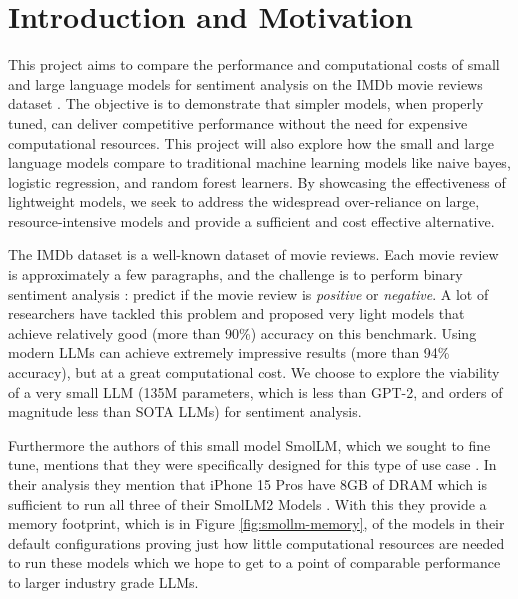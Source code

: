 \documentclass[10pt,twocolumn,letterpaper]{article}
\begin{document}
\section{Introduction and Motivation}


This project aims to compare the performance and computational costs of small and large language models for sentiment analysis on the IMDb movie reviews dataset \cite{IMDB-dataset}. The objective is to demonstrate that simpler models, when properly tuned, can deliver competitive performance without the need for expensive computational resources.  This project will also explore how the small and large language models compare to traditional machine learning models like naive bayes, logistic regression, and random forest learners. By showcasing the effectiveness of lightweight models, we seek to address the widespread over-reliance on large, resource-intensive models and provide a sufficient and cost effective alternative. 

The IMDb dataset is a well-known dataset of movie reviews. Each movie review is approximately a few paragraphs, and the challenge is to perform binary sentiment analysis : predict if the movie review is \textit{positive} or \textit{negative}. A lot of researchers have tackled this problem and proposed very light models that achieve relatively good (more than 90\%) accuracy on this benchmark. Using modern LLMs can achieve extremely impressive results (more than 94\% accuracy), but at a great computational cost. We choose to explore the viability of a very small LLM (135M parameters, which is less than GPT-2, and orders of magnitude less than SOTA LLMs) for sentiment analysis.

Furthermore the authors of this small model SmolLM, which we sought to fine tune, mentions that they were specifically designed for this type of use case \cite{hf-smollm-usecase}. In their analysis they mention that iPhone 15 Pros have 8GB of DRAM which is sufficient to run all three of their SmolLM2 Models \cite{hf-smollm2-collection}. With this they provide a memory footprint, which is in Figure \ref{fig:smollm-memory}, of the models in their default configurations proving just how little computational resources are needed to run these models which we hope to get to a point of comparable performance to larger industry grade LLMs.
\end{document}
